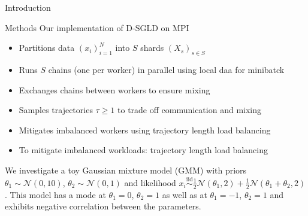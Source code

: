 \documentclass[final]{beamer}
\newlength{\onecolwid}
\begin{document}
\begin{frame}[t]
\begin{columns}[t]
\begin{column}{\onecolwid}
\begin{block}{Introduction}
\end{block}

\begin{block}{Methods}
  Our implementation of D-SGLD on MPI
  \begin{itemize}
    \item Partitions data $(x_i)_{i=1}^N$ into $S$ shards $(X_s)_{s \in S}$
    \item Runs $S$ chains (one per worker) in parallel using local daa for minibatck
    \item Exchanges chains between workers to ensure mixing \citep{ahn2014distributed}
    \item Samples trajectories $\tau \geq 1$ to trade off communication and mixing \citep{ahn2014distributed}
    \item Mitigates imbalanced workers using trajectory length load balancing \citep{ahn2014distributed}
    \item To mitigate imbalanced workloads: trajectory length load balancing\citep{ahn2014distributed}
  \end{itemize}

  We investigate a toy Gaussian mixture model (GMM) with
  priors $\theta_1 \sim \mathcal{N}(0,10)$, $\theta_2 \sim \mathcal{N}(0,1)$
  and likelihood
  $x_i \overset{\text{iid}}{\sim} \frac{1}{2}\mathcal{N}(\theta_1, 2) + \frac{1}{2}\mathcal{N}(\theta_1 + \theta_2, 2)$.
  This model has a mode at $\theta_1 = 0$, $\theta_2 = 1$ as well as at
  $\theta_1 = -1$, $\theta_2 = 1$ and exhibits negative correlation
  between the parameters.
\end{block}




\end{column}
\end{columns}
\end{frame}
\end{document}
